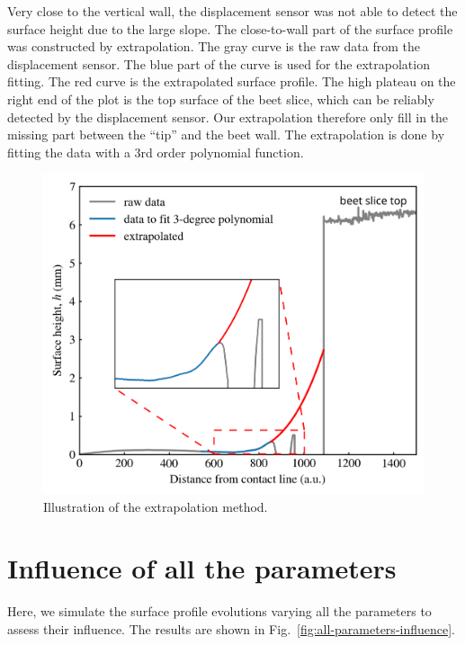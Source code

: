 \documentclass[aps,pre,onecolumn,superscriptaddress,notitlepage,10pt]{revtex4-2}
\begin{document}
Very close to the vertical wall, the displacement sensor was not able to detect the surface height due to the large slope.
The close-to-wall part of the surface profile was constructed by extrapolation.
The gray curve is the raw data from the displacement sensor. 
The blue part of the curve is used for the extrapolation fitting. The red curve is the extrapolated surface profile. 
The high plateau on the right end of the plot is the top surface of the beet slice, which can be reliably detected by the displacement sensor. 
Our extrapolation therefore only fill in the missing part between the ``tip'' and the beet wall. 
The extrapolation is done by fitting the data with a 3rd order polynomial function.

\begin{figure}[ht]
    \centering
    \includegraphics[width=\textwidth]{Figures/extrapolation_illustration.png}
    \caption{
    Illustration of the extrapolation method. 
    }
    \label{fig:extrapolation}
\end{figure}

\newpage

\section{Influence of all the parameters}

Here, we simulate the surface profile evolutions varying all the parameters to assess their influence. The results are shown in Fig.~\ref{fig:all-parameters-influence}.
\end{document}
